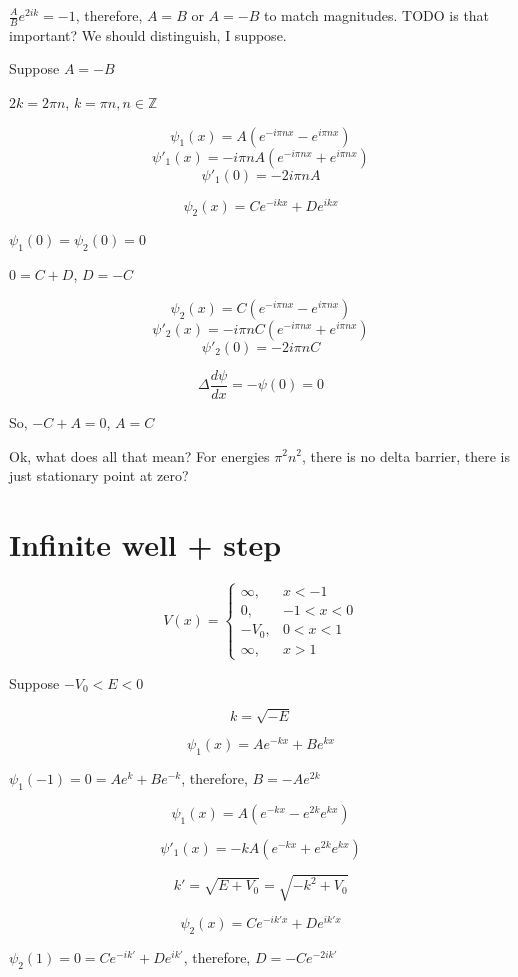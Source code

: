 \documentclass[12pt, a4paper]{article}
\begin{document}
$\frac{A}{B} e^{2ik} = -1$, therefore, $A = B$ or $A = -B$ to match magnitudes. TODO is that important? We should distinguish, I suppose.

Suppose $A = -B$

$2k = 2 \pi n$, $k = \pi n, n \in \mathbb{Z}$

$$\psi_1(x) = A (e^{-i \pi n x} - e^{i \pi n x})$$
$$\psi'_1(x) = -i \pi n A (e^{-i \pi n x} + e^{i \pi n x})$$
$$\psi'_1(0) = -2 i \pi n A$$



$$\psi_2(x) = C e^{-i k x} + D e^{ikx}$$


$\psi_1(0) = \psi_2(0) = 0$

$0 = C + D$, $D = -C$

$$\psi_2(x) = C (e^{-i \pi n x} - e^{i \pi n x})$$
$$\psi'_2(x) = -i \pi n C (e^{-i \pi n x} + e^{i \pi n x})$$
$$\psi'_2(0) = -2 i \pi n C$$

$$\Delta \frac{d \psi}{dx} = -\psi(0) = 0$$

So, $-C + A = 0$, $A = C$

Ok, what does all that mean? For energies $\pi^2 n^2$, there is no delta barrier, there is just stationary point at zero?


\section{Infinite well + step}

$$V(x) = \begin{cases}
\infty, & x < -1 \\
0, & -1 < x < 0 \\
-V_0, & 0 < x < 1 \\
\infty, & x > 1
\end{cases}$$

Suppose $-V_0 < E < 0$

$$k = \sqrt{-E}$$

$$\psi_1(x) = A e^{-kx} + B e^{kx}$$

$\psi_1(-1) = 0 = A e^k + B e^{-k}$, therefore, $B = -A e^{2k}$

$$\psi_1(x) = A (e^{-kx} - e^{2k} e^{kx})$$

$$\psi'_1(x) = -k A (e^{-kx} + e^{2k} e^{kx})$$

$$k' = \sqrt{E + V_0} = \sqrt{-k^2 + V_0}$$

$$\psi_2(x) = C e^{-ik'x} + D e^{ik'x}$$

$\psi_2(1) = 0 = C e^{-ik'} + D e^{ik'}$, therefore, $D = -C e^{-2ik'}$
\end{document}
